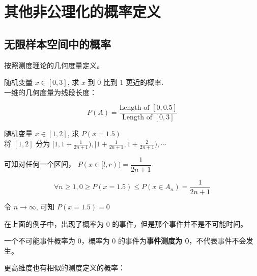 \section{其他非公理化的概率定义}

\subsection{无限样本空间中的概率}

按照测度理论的几何度量定义。

\begin{example}{}{}
    随机变量 $x \in [0, 3]$, 求 $x$ 到 $0$ 比到 $1$ 更近的概率.\\
    
    一维的几何度量为线段长度：
    
    $$
    P(A) = \frac{\text{Length of } [0, 0.5]}{\text{Length of } [0, 3]}
    $$
\end{example}

\begin{example}{}{}
    随机变量 $x \in [1, 2]$, 求 $P(x = 1.5)$\\
    
    将 $[1, 2]$ 分为 $[1, 1 + \frac{1}{2n + 1}), [1 + \frac{1}{2n + 1}, 1 + \frac{2}{2n + 1}), \cdots$
    
    可知对任何一个区间， $P(x \in [l, r)) = \dfrac{1}{2n + 1}$
    
    $$
    \forall n \ge 1, 0 \ge P(x = 1.5) \le P(x \in A_n) = \dfrac{1}{2n + 1}
    $$
    
    令 $n \to \infty$, 可知 $P(x = 1.5) = 0$
\end{example}

在上面的例子中，出现了概率为 $0$ 的事件，但是那个事件并不是不可能时间。

一个不可能事件概率为 $0$，概率为 $0$ 的事件为\textbf{事件测度为 0}，不代表事件不会发生。

更高维度也有相似的测度定义的概率：

